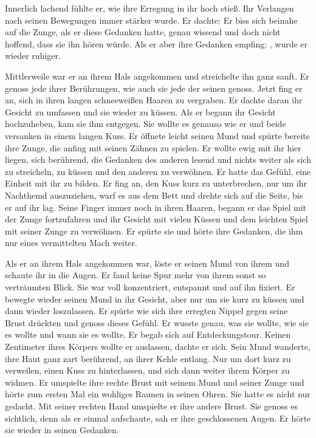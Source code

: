 \begin{abAchtzehn}


Innerlich lachend fühlte er, wie ihre Erregung in ihr hoch stieß. Ihr Verlangen nach seinen Bewegungen immer stärker wurde. Er dachte:  Er biss sich beinahe auf die Zunge, als er diese Gedanken hatte, genau wissend und doch nicht hoffend, dass sie ihn hören würde. Als er aber ihre Gedanken empfing: , wurde er wieder ruhiger.

Mittlerweile war er an ihrem Hals angekommen und streichelte ihn ganz sanft. Er genoss jede ihrer Berührungen, wie auch sie jede der seinen genoss. Jetzt fing er an, sich in ihren langen schneeweißen Haaren zu vergraben. Er dachte daran ihr Gesicht zu umfassen und sie wieder zu küssen. Als er begann ihr Gesicht hochzuheben, kam sie ihm entgegen. Sie wollte es genauso wie er und beide versanken in einem langen Kuss. Er öffnete leicht seinen Mund und spürte bereits ihre Zunge, die anfing mit seinen Zähnen zu spielen.  Er wollte ewig mit ihr hier liegen, sich berührend, die Gedanken des anderen lesend und nichts weiter als sich zu streicheln, zu küssen und den anderen zu verwöhnen. Er hatte das Gefühl, eine Einheit mit ihr zu bilden. Er fing an, den Kuss kurz zu unterbrechen, nur um ihr Nachthemd auszuziehen, warf es aus dem Bett und drehte sich auf die Seite, bis er auf ihr lag. Seine Finger immer noch in ihren Haaren, begann er das Spiel mit der Zunge fortzufahren und ihr Gesicht mit vielen Küssen und dem leichten Spiel mit seiner Zunge zu verwöhnen. Er spürte sie und hörte ihre Gedanken, die ihm nur eines vermittelten \gst Mach weiter.

Als er an ihrem Hals angekommen war, löste er seinen Mund von ihrem und schaute ihr in die Augen. Er fand keine Spur mehr von ihrem sonst so verträumten Blick. Sie war voll konzentriert, entspannt und auf ihn fixiert. Er bewegte wieder seinen Mund in ihr Gesicht, aber nur um sie kurz zu küssen und dann wieder loszulassen. Er spürte wie sich ihre erregten Nippel gegen seine Brust drückten und genoss dieses Gefühl. Er wusste genau, was sie wollte, wie sie es wollte und wann sie es wollte. Er begab sich auf Entdeckungstour. Keinen Zentimeter ihres Körpers wollte er auslassen, dachte er sich. Sein Mund wanderte, ihre Haut ganz zart berührend, an ihrer Kehle entlang. Nur um dort kurz zu verweilen, einen Kuss zu hinterlassen, und sich dann weiter ihrem Körper zu widmen. Er umspielte ihre rechte Brust mit seinem Mund und seiner Zunge und hörte zum ersten Mal ein wohliges Raunen in seinen Ohren. Sie hatte es nicht nur gedacht. Mit seiner rechten Hand umspielte er ihre andere Brust. Sie genoss es sichtlich, denn als er einmal aufschaute, sah er ihre geschlossenen Augen. Er hörte sie wieder in seinen Gedanken.


\end{abAchtzehn}

